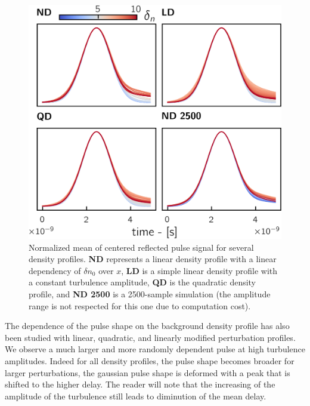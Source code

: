 \documentclass[11pt,openany]{report}
\begin{document}
\begin{multicols}{2}
    \begin{figure}[H]
        \centering
        \includegraphics[width=1\linewidth]{./figures/pulse_shape.png}
        \caption{Normalized mean of centered reflected pulse signal for several density profiles. \textbf{ND} represents a linear density profile with a linear dependency of $\delta n_0$ over $x$, \textbf{LD} is a simple linear density profile with a constant turbulence amplitude, \textbf{QD} is the quadratic density profile, and \textbf{ND 2500} is a 2500-sample simulation (the amplitude range is not respected for this one due to computation cost).}

        \label{fig:barrier}
    \end{figure}


    The dependence of the pulse shape on the background density profile has also been studied with linear, quadratic, and linearly modified perturbation profiles. We  observe a much larger and more randomly dependent pulse at high turbulence amplitudes. Indeed for all density profiles, the pulse shape becomes broader for larger perturbations, the gaussian pulse shape is deformed with a peak that is shifted to the higher delay. The reader will note that the increasing of the amplitude of the turbulence still leads to diminution of the mean delay.


\end{multicols}
\end{document}
